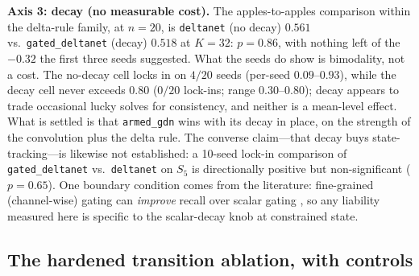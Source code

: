 \documentclass{article}
\newcommand{\armed}{\texttt{armed\_gdn}}
\newcommand{\gdn}{\texttt{gated\_deltanet}}
\newcommand{\dnet}{\texttt{deltanet}}
\begin{document}
\textbf{Axis 3: decay (no measurable cost).} The apples-to-apples comparison within the delta-rule family, at $n{=}20$, is \dnet{} (no decay) $0.561$ vs.\ \gdn{} (decay) $0.518$ at $K{=}32$: $p{=}0.86$, with nothing left of the $-0.32$ the first three seeds suggested. What the seeds do show is bimodality, not a cost. The no-decay cell locks in on $4/20$ seeds (per-seed $0.09$--$0.93$), while the decay cell never exceeds $0.80$ ($0/20$ lock-ins; range $0.30$--$0.80$); decay appears to trade occasional lucky solves for consistency, and neither is a mean-level effect. What is settled is that \armed{} wins with its decay in place, on the strength of the convolution plus the delta rule. The converse claim---that decay buys state-tracking---is likewise not established: a 10-seed lock-in comparison of \gdn{} vs.\ \dnet{} on $S_5$ is directionally positive but non-significant ($p{=}0.65$). One boundary condition comes from the literature: fine-grained (channel-wise) gating can \emph{improve} recall over scalar gating \citep{kimilinear2025}, so any liability measured here is specific to the scalar-decay knob at constrained state.

\subsection{The hardened transition ablation, with controls}\label{sec:hardened}
\end{document}

